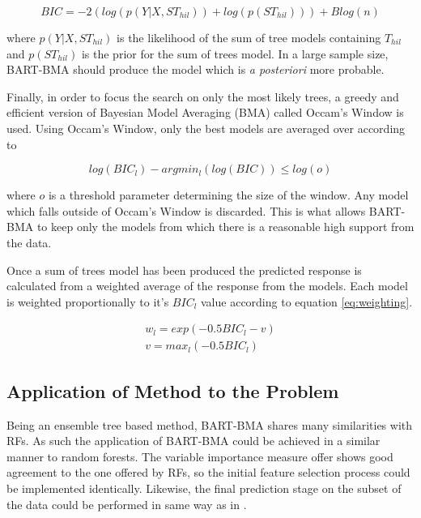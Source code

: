 \documentclass[journal]{IEEEtran}
\begin{document}
\begin{equation}
	BIC = -2(log(p(Y|X,ST_{hil})) + log(p(ST_{hil}))) + B log(n)
\end{equation}

where $p(Y|X,ST_{hil})$ is the likelihood of the sum of tree models containing $T_{hil}$ and $p(ST_{hil})$ is the prior for the sum of trees model. In a large sample size, BART-BMA should produce the model which is \textit{a posteriori} more probable.

Finally, in order to focus the search on only the most likely trees, a greedy and efficient version of Bayesian Model Averaging (BMA) called Occam's Window is used. Using Occam's Window, only the best models are averaged over according to

\begin{equation}
	log(BIC_l) - argmin_l(log(BIC)) \leq log(o)
\end{equation}

where $o$ is a threshold parameter determining the size of the window. Any model which falls outside of Occam's Window is discarded. This is what allows BART-BMA to keep only the models from which there is a reasonable high support from the data.

Once a sum of trees model has been produced the predicted response is calculated from a weighted average of the response from the models. Each model is weighted proportionally to it's $BIC_l$ value according to equation \ref{eq:weighting}.

\begin{equation}
\label{eq:weighting}
\begin{split}
	w_l = exp(-0.5 BIC_l - v)\\
	v = max_l(-0.5 BIC_l)
\end{split}
\end{equation}

\subsection{Application of Method to the Problem}
Being an ensemble tree based method, BART-BMA shares many similarities with RFs. As such the application of BART-BMA could be achieved in a similar manner to random forests. The variable importance measure offer shows good agreement to the one offered by RFs, so the initial feature selection process could be implemented identically. Likewise, the final prediction stage on the subset of the data could be performed in same way as in \cite{riddick2011predicting}.
\end{document}
